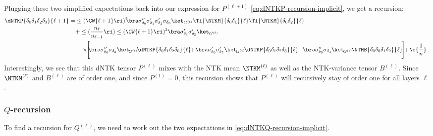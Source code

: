 Plugging these two simplified expectations back into our expression for  $P^{(\ell+1)}$ \eqref{eq:dNTKP-recursion-implicit}, we get a recursion:
\begin{align}
\dNTKP{\delta_0\delta_1\delta_2\delta_3}{\ell+1}=&\le(\CW{\ell+1}\ri)^2\!\!\bra\sigma^{\prime\prime}_{\delta_0}\sigma^{\prime}_{\delta_1}\sigma^{\prime}_{\delta_2}\sigma_{\delta_3} \ket_{G^{(\ell)}}\Ti{\NTKM}{\delta_0\delta_1}{\ell}\Ti{\NTKM}{\delta_0\delta_2}{\ell}\, \label{eq:dNTKP-recursion-explicit}\\
&+\le(\frac{n_{\ell}}{n_{\ell-1}}\ri)\le(\CW{\ell+1}\ri)^2\bra\sigma^{\prime}_{\delta_1}\sigma^{\prime}_{\delta_2}\ket_{G^{(\ell)}}\, \notag\\
&\quad \times\!\!\Bigg[\!\!\bra\sigma^{\prime\prime}_{\delta_0}\sigma_{\delta_3}\ket_{\!G^{(\ell)}}\!\dNTKP{\delta_0\delta_1\delta_2\delta_0}{\ell}\!\!+\!\bra\sigma^{\prime}_{\delta_0}\sigma^{\prime}_{\delta_3}\ket_{\!G^{(\ell)}}\!\dNTKP{\delta_0\delta_1\delta_2\delta_3}{\ell}\!\!+\!\bra\sigma^{\prime\prime}_{\delta_0} \sigma_{\delta_3} \ket_{\!G^{(\ell)}}\!\NTHB{\delta_0\delta_0\delta_1\delta_2}{\ell} \!\Bigg]\!\!+\!\o{\frac{1}{n}}\, . \notag
\end{align}
Interestingly, we see that this dNTK tensor $P^{(\ell)}$ mixes with the NTK mean $\NTKM^{(\ell)}$ as well as the NTK-variance tensor $B^{(\ell)}$.
Since $\NTKM^{(\ell)}$ and $B^{(\ell)}$ are of order one, and since $P^{(1)}=0$, this recursion shows that $P^{(\ell)}$ will recursively stay of order one for all layers $\ell$.






\subsubsection{$Q$-recursion}
To find a recursion for $Q^{(\ell)}$, we need to work out the two expectations in \eqref{eq:dNTKQ-recursion-implicit}. 


